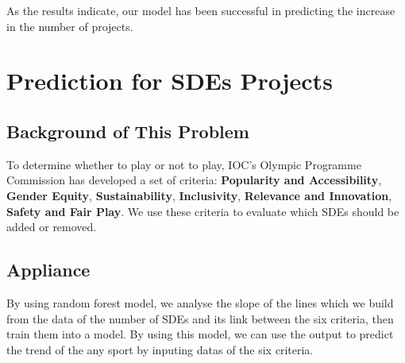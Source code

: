 \documentclass[a4paper]{article}
\begin{document}

As the results indicate, our model has been successful in predicting the increase in the number of projects.



\section{Prediction for SDEs Projects}
\subsection{Background of This Problem}
To determine whether to play or not to play, IOC’s Olympic Programme Commission has developed a set of 
criteria: \textbf{Popularity and Accessibility}, \textbf{Gender Equity},  \textbf{Sustainability}, \textbf{Inclusivity}, \textbf{Relevance and Innovation}, \textbf{Safety and Fair Play}. We use these criteria to evaluate which SDEs should be added or removed.
\subsection{Appliance}
By using random forest model, we analyse the slope of the lines which we build from the data of the number of SDEs and its link between the six criteria, then train them into a model. By using this model, we can use the output to predict the trend of the any sport by inputing datas of the six criteria.
\end{document}

